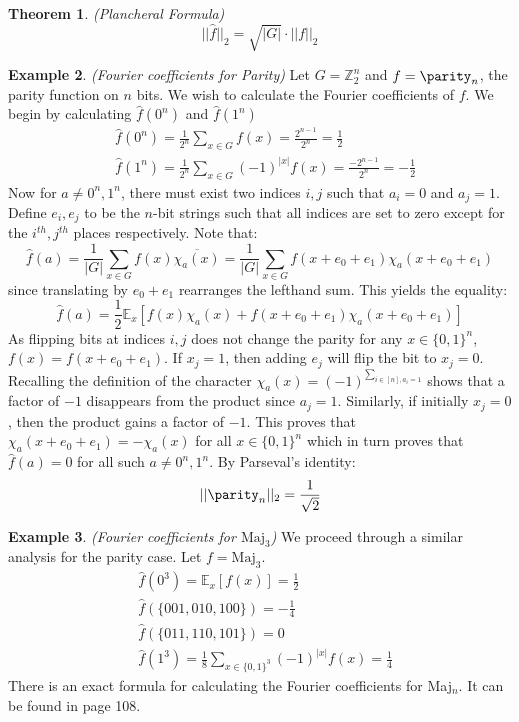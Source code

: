 \documentclass{amsart}
\newtheorem{theorem}{Theorem}[section]
\theoremstyle{definition}
\newtheorem{example}[theorem]{Example}
\theoremstyle{remark}
\numberwithin{equation}{section}
\theoremstyle{remark}
\begin{document}
\begin{theorem}{(Plancheral Formula)}
  $$||\hat{f}||_2 = \sqrt{|G|}\cdot||f||_2$$
\end{theorem}
%
\begin{example}{\emph{(Fourier coefficients for Parity)}}
  Let $G = \mathbb{Z}_2^n$ and $f = \parity_n$, the parity function on $n$ bits.
  We wish to calculate the Fourier coefficients of $f$. We begin by calculating $\hat{f}(0^n)$ and $\hat{f}(1^n)$
  \begin{align}
    & \hat{f}(0^n) = \frac{1}{2^n}\sum_{x \in G} f(x) = \frac{2^{n-1}}{2^n} = \frac{1}{2} \\
    & \hat{f}(1^n) = \frac{1}{2^n}\sum_{x \in G} (-1)^{|x|}f(x) = \frac{-2^{n-1}}{2^n} = -\frac{1}{2}
  \end{align}
  Now for $a \neq 0^n,1^n$, there must exist two indices $i,j$ such that $a_i = 0$ and $a_j = 1$. Define $e_i, e_j$ to be the $n$-bit strings such that all indices are set to zero except for the $i^{th},j^{th}$ places respectively. Note that:
  $$ \hat{f}(a) = \frac{1}{|G|} \sum_{x \in G} f(x)\overline{\chi_a(x)} = \frac{1}{|G|}\sum_{x \in G} f(x + e_0 + e_1) \chi_a(x + e_0 + e_1)$$
  since translating by $e_0 + e_1$ rearranges the lefthand sum. This yields the equality:
  $$ \hat{f}(a) = \frac{1}{2}\mathbb{E}_x[f(x)\chi_a(x) + f(x + e_0 + e_1) \chi_a(x + e_0 + e_1)] $$
  As flipping bits at indices $i,j$ does not change the parity for any $x \in \{0,1\}^n$, $f(x) = f(x + e_0 + e_1)$. If $x_j = 1$, then adding $e_j$ will flip the bit to $x_j = 0$. Recalling the definition of the character $\chi_a(x) = (-1)^{\sum_{i \in [n], a_i = 1}}$ shows that a factor of $-1$ disappears from the product since $a_j = 1$. Similarly, if initially $x_j = 0$, then the product gains a factor of $-1$. This proves that $\chi_a(x + e_0 + e_1) = - \chi_a(x)$ for all $x \in \{0,1\}^n$ which in turn proves that $\hat{f}(a) = 0$ for all such $a \neq 0^n,1^n$. By Parseval's identity:
  $$||\parity_n||_2 = \frac{1}{\sqrt{2}} $$
\end{example}
%
\begin{example}{\emph{(Fourier coefficients for $\text{Maj}_3$)}}
 We proceed through a similar analysis for the parity case. Let $f = \text{Maj}_3$.
 \begin{align}
   & \hat{f}(0^3) = \mathbb{E}_x[f(x)] = \frac{1}{2} \\
   & \hat{f}(\{001,010,100\}) = - \frac{1}{4} \\
   & \hat{f}(\{011,110,101\}) = 0 \\
   & \hat{f}(1^3) = \frac{1}{8}\sum_{x \in \{0,1\}^3} (-1)^{|x|}f(x) = \frac{1}{4}
 \end{align}
 There is an exact formula for calculating the Fourier coefficients for Maj$_{n}$. It can be found in \cite{odonnell} page 108.
\end{example}
\end{document}
